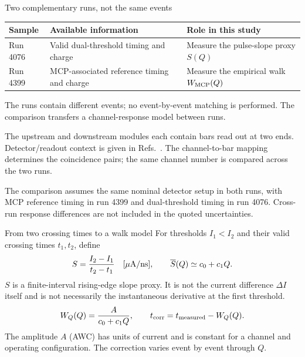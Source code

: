 


\OpeningSlides

\begin{frame}{Two complementary runs, not the same events}
\small
\begin{tabular}{l>{\raggedright\arraybackslash}p{4.8cm}>{\raggedright\arraybackslash}p{5.2cm}}
\toprule
Sample & Available information & Role in this study\\
\midrule
Run 4076 & Valid dual-threshold timing and charge & Measure the pulse-slope proxy $S(Q)$\\
Run 4399 & MCP-associated reference timing and charge & Measure the empirical walk $W_{\rm MCP}(Q)$\\
\bottomrule
\end{tabular}\par
\medskip
The runs contain different events; no event-by-event matching is performed.
The comparison transfers a channel-response model between runs.

The upstream and downstream modules each contain bars read out at two ends.
Detector/readout context is given in Refs.~\cite{MTDTDR,TOFHIR2}.
The channel-to-bar mapping determines the coincidence pairs; the same channel
number is compared across the two runs.

The comparison assumes the same nominal detector setup in both runs,
with MCP reference timing in run 4399 and dual-threshold timing in run 4076.
Cross-run response differences are not included in the quoted uncertainties.
\end{frame}

\begin{frame}{From two crossing times to a walk model}
\small
For thresholds $I_1<I_2$ and their valid crossing times $t_1,t_2$, define
\[
 S=\frac{I_2-I_1}{t_2-t_1}\quad [\mu{\rm A/ns}],\qquad
 \overline S(Q)\simeq c_0+c_1Q.
\]
$S$ is a finite-interval rising-edge slope proxy. It is not the current
difference $\Delta I$ itself and is not necessarily the instantaneous
derivative at the first threshold.
\[
 W_Q(Q)=\frac{A}{c_0+c_1Q},\qquad t_{\rm corr}=t_{\rm measured}-W_Q(Q).
\]
The amplitude $A$ (AWC) has units of current and is constant for a channel
and operating configuration. The correction varies event by event through $Q$.
\end{frame}


